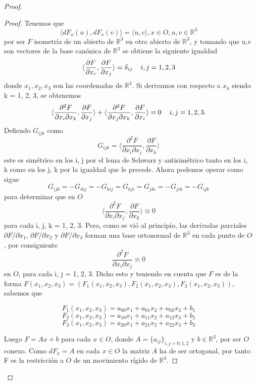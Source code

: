 \begin{proof}
	\begin{proof}
		Tenemos que
		\[
		\langle dF_x(u), dF_x(v) \rangle = \langle u, v \rangle , x \in O, u,v \in \mathbb{R}^3
		\]
		por ser $F$ isometría de un abierto de $\mathbb{R}^3$ en otro abierto de $\mathbb{R}^3$, y tomando que u,v son vectores de la base canónica de $\mathbb{R}^3$ se obtiene la siguiente igualdad
		\[
		\langle \frac{\partial F}{\partial x_i}, \frac{\partial F}{\partial x_j} \rangle = \delta_{ij} \thinspace \thinspace \thinspace \thinspace \thinspace \thinspace \thinspace i,j = 1,2,3
		\]
 		donde $x_1, x_2, x_3$ son las coordenadas de $\mathbb{R}^3$. Si derivamos con respecto a $x_k$ siendo k = 1, 2, 3, se obtenemos
		\[
		\langle\frac{\partial^2 F}{\partial x_i \partial x_k}, \frac{\partial F}{\partial x_j} \rangle + \langle \frac{\partial^2 F}{\partial x_j \partial x_k}, \frac{\partial F}{\partial x_i} \rangle = 0 \thinspace \thinspace \thinspace \thinspace \thinspace \thinspace \thinspace i,j = 1,2,3.
		\]
		Defiendo $G_{ijk}$ como
		\[
		G_{ijk} = \langle \frac{\partial^2 F}{\partial x_i \partial x_j}, \frac{\partial F}{\partial x_k} \rangle
		\]
		este es simétrico en los i, j por el lema de Schwarz y antisimétrico tanto en los i, k como en los j, k por la igualdad que le precede. Ahora podemos operar como sigue
		\[
		G_{ijk} = -G_{ikj} = -G_{kij} = G_{kji} = G_{jki} = -G_{jik} = -G_{ijk}
		\]
		para determinar que en $O$
		\[
		\langle \frac{\partial^2 F}{\partial x_i \partial x_j}, \frac{\partial F}{\partial x_k} \rangle \equiv 0
		\]
		para cada i, j, k = 1, 2, 3. Pero, como se vió al principio, las derivadas parciales $\partial F / \partial x_1$, $\partial F / \partial x_2$ y $\partial F / \partial x_3$ forman una base ortonormal de $\mathbb{R}^3$ en cada punto de $O$, por consiguiente
		\[
		\frac{\partial^2 F}{\partial x_i \partial x_j} \equiv 0
		\] en $O$, para cada  i, j = 1, 2, 3. Dicho esto y teniendo en cuenta  que $F$ es de la forma $F(x_1, x_2, x_3) = (F_1(x_1, x_2, x_3), F_2(x_1, x_2, x_3), F_3(x_1, x_2, x_3))$, sabemos que
		
		\[
		F_1(x_1, x_2, x_3) = a_{00}x_1 + a_{01}x_2 + a_{02}x_3 + b_1
		\]
		\[
		F_2(x_1, x_2, x_3) = a_{10}x_1 + a_{11}x_2 + a_{12}x_3 + b_2
		\]
		\[
		F_3(x_1, x_2, x_3) = a_{20}x_1 + a_{21}x_2 + a_{22}x_3 + b_3
		\]
		
		${ }$\\	
		
		Luego $F = Ax + b$ para cada $x \in O$, donde $A = \{a_{ij}\}_{i,j=0,1,2}$ y $b \in \mathbb{R}^3$, por ser $O$ conexo. Como $dF_x=A$ en cada $x \in O$ la matriz $A$ ha de ser ortogonal, por tanto F es la restricción a $O$ de un movimiento rígido de $\mathbb{R}^3$.
		
	\end{proof}
	
\end{proof}
${ }$\\



